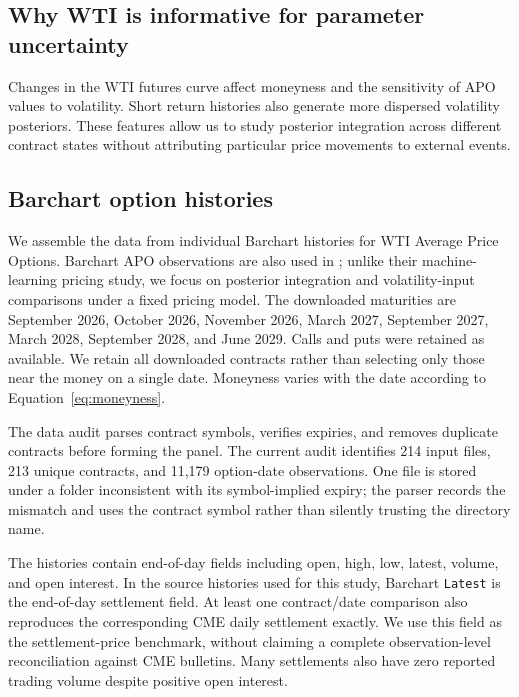 \subsection{Why WTI is informative for parameter uncertainty}

Changes in the WTI futures curve affect moneyness and the sensitivity of APO values to volatility. Short return histories also generate more dispersed volatility posteriors. These features allow us to study posterior integration across different contract states without attributing particular price movements to external events.

\subsection{Barchart option histories}

We assemble the data from individual Barchart histories for WTI Average Price Options. Barchart APO observations are also used in \cite{ganwangyang2020}; unlike their machine-learning pricing study, we focus on posterior integration and volatility-input comparisons under a fixed pricing model. The downloaded maturities are September 2026, October 2026, November 2026, March 2027, September 2027, March 2028, September 2028, and June 2029. Calls and puts were retained as available. We retain all downloaded contracts rather than selecting only those near the money on a single date. Moneyness varies with the date according to Equation~\eqref{eq:moneyness}.

The data audit parses contract symbols, verifies expiries, and removes duplicate contracts before forming the panel. The current audit identifies 214 input files, 213 unique contracts, and 11,179 option-date observations. One file is stored under a folder inconsistent with its symbol-implied expiry; the parser records the mismatch and uses the contract symbol rather than silently trusting the directory name.

The histories contain end-of-day fields including open, high, low, latest, volume, and open interest. In the source histories used for this study, Barchart \texttt{Latest} is the end-of-day settlement field. At least one contract/date comparison also reproduces the corresponding CME daily settlement exactly. We use this field as the settlement-price benchmark, without claiming a complete observation-level reconciliation against CME bulletins. Many settlements also have zero reported trading volume despite positive open interest.

